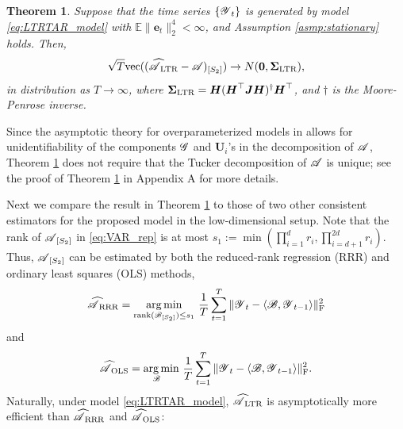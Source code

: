 \documentclass[12pt]{article}
\newtheorem{theorem}{Theorem}
\newtheorem{corollary}{Corollary}
\DeclareMathOperator*{\argmin}{arg\,min}
\newcommand{\bm}{\boldsymbol}
\newcommand{\cm}[1]{\mbox{\boldmath$\mathscr{#1}$}}
\begin{document}
\begin{theorem}
	\label{thm:Asymptotic}
	Suppose that the time series $\{\cm{Y}_t\}$ is generated by model \eqref{eq:LTRTAR_model} with $\mathbb{E}\|\bm{e}_t\|_2^4<\infty$, and Assumption \ref{asmp:stationary} holds. Then,
	\begin{equation}
	\sqrt{T}\textup{vec}((\cm{\widehat{A}}_{\textup{LTR}}-\cm{A})_{[S_2]})\rightarrow N(\bm{0},\bm{\bm{\Sigma}}_{\textup{LTR}}),
	\end{equation}
	in distribution as $T\rightarrow\infty$, where $\bm{\bm{\Sigma}}_{\textup{LTR}}=\bm{H}(\bm{H}^\top\bm{JH})^{\dagger}\bm{H}^\top$, and $\dagger$ is the Moore-Penrose inverse.
\end{theorem}

Since the asymptotic theory for overparameterized models in  \cite{shapiro1986asymptotic} allows for unidentifiability of the components $\cm{G}$ and $\bm{U}_i$'s in the decomposition of $\cm{A}$, Theorem \ref{thm:Asymptotic} does not require that the Tucker decomposition of $\cm{A}$ is unique; see  the proof of Theorem \ref{thm:Asymptotic}  in Appendix A for more details.




Next we compare the result in Theorem \ref{thm:Asymptotic} to those of two other consistent estimators for the proposed model in the low-dimensional setup. Note that the rank of $\cm{A}_{[S_2]}$ in \eqref{eq:VAR_rep} is at most $s_1:=\min(\prod_{i=1}^dr_i,\prod_{i=d+1}^{2d}r_i)$. Thus, $\cm{A}_{[S_2]}$ can be estimated by both
the reduced-rank regression (RRR) and ordinary least squares (OLS) methods,
\begin{equation}\label{eq:RRR}
\cm{\widehat{A}}_{\text{RRR}}=\underset{\text{rank}(\scalebox{0.7}{\cm{B}}_{[S_2]})\leq s_1}{\argmin}~\frac{1}{T}\sum_{t=1}^T\|\cm{Y}_t-\langle\cm{B},\cm{Y}_{t-1}\rangle\|_\text{F}^2
\end{equation}
and
\begin{equation*}
\cm{\widehat{A}}_{\text{OLS}}=\underset{\scalebox{0.7}{\cm{B}}}{\argmin}~\frac{1}{T}\sum_{t=1}^T\|\cm{Y}_t-\langle\cm{B},\cm{Y}_{t-1}\rangle\|_\text{F}^2.
\end{equation*}
Naturally, under model \eqref{eq:LTRTAR_model},  $\cm{\widehat{A}}_{\text{LTR}}$ is asymptotically more efficient than $\cm{\widehat{A}}_{\textup{RRR}}$ and $\cm{\widehat{A}}_{\textup{OLS}}$:
\end{document}
